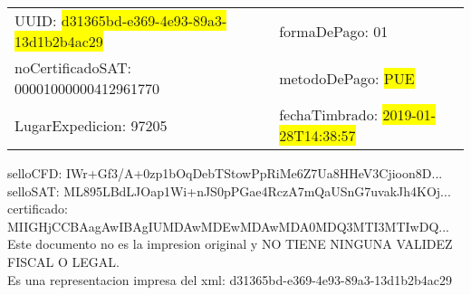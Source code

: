 \documentclass{article}
\begin{document}
\begin{tabular}{p{11cm}p{1cm}p{8cm}}
\bigskip
UUID: \colorbox{yellow}{ d31365bd-e369-4e93-89a3-13d1b2b4ac29 } & & formaDePago: 01\\

noCertificadoSAT: 00001000000412961770 & & metodoDePago: \colorbox{yellow}{ PUE }\\

LugarExpedicion: 97205 & & fechaTimbrado: \colorbox{yellow}{ 2019-01-28T14:38:57 } \\
\end{tabular}

\bigskip
selloCFD: IWr+Gf3/A+0zp1bOqDebTStowPpRiMe6Z7Ua8HHeV3Cjioon8D... \\
selloSAT: ML895LBdLJOap1Wi+nJS0pPGae4RczA7mQaUSnG7uvakJh4KOj... \\

certificado: MIIGHjCCBAagAwIBAgIUMDAwMDEwMDAwMDA0MDQ3MTI3MTIwDQ...\bigskip\bigskip\bigskip\bigskip\bigskip\bigskip
\\Este documento no es la impresion original y NO TIENE NINGUNA VALIDEZ FISCAL O LEGAL. \\
 Es una representacion impresa del xml:  d31365bd-e369-4e93-89a3-13d1b2b4ac29 \\
\end{document}
